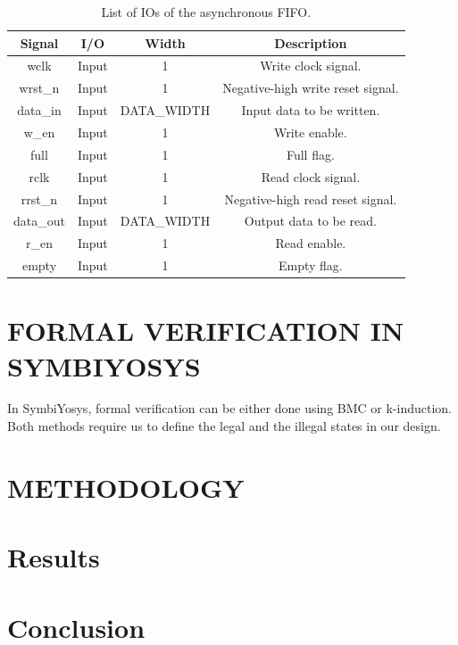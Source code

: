 \documentclass[conference]{IEEEtran}
\begin{document}
\begin{table}[h!]
    \caption{List of IOs of the asynchronous FIFO.}
    \centering
    \begin{tabular}{|c c c c|}
        \hline
        Signal & I/O & Width & Description \\
        \hline
        wclk & Input & 1 & Write clock signal. \\
        wrst\_n & Input & 1 & Negative-high write reset signal. \\
        data\_in & Input & DATA\_WIDTH & Input data to be written.  \\
        w\_en & Input & 1 & Write enable. \\
        full & Input & 1 & Full flag. \\ 
        rclk & Input & 1 & Read clock signal. \\
        rrst\_n & Input & 1 & Negative-high read reset signal. \\
        data\_out & Input & DATA\_WIDTH & Output data to be read.  \\
        r\_en & Input & 1 & Read enable. \\
        empty & Input & 1 & Empty flag. \\ 
        \hline  
    \end{tabular}
    \label{tab:io}
\end{table}

\section{FORMAL VERIFICATION IN SYMBIYOSYS}
In SymbiYosys, formal verification can be either done using BMC or k-induction. Both methods require us to define the legal and the illegal states in our design.
\section{METHODOLOGY}

\section{Results}

\section{Conclusion}

%
%
\end{document}
